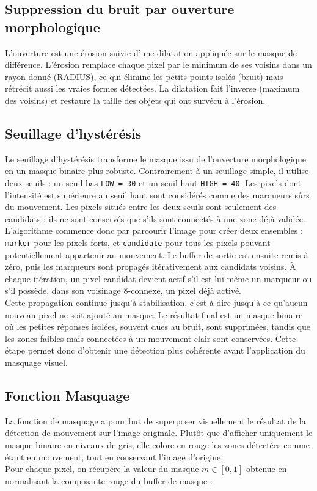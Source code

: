 \documentclass[12pt]{article}
\begin{document}
    \subsection{Suppression du bruit par ouverture morphologique}
    L'ouverture est une érosion suivie d'une dilatation appliquée sur le masque de différence. L'érosion remplace chaque pixel par le minimum de ses voisins dans un rayon donné (RADIUS), ce qui élimine les petits points isolés (bruit) mais rétrécit aussi les vraies formes détectées. La dilatation fait l'inverse (maximum des voisins) et restaure la taille des objets qui ont survécu à l'érosion.

    \subsection{Seuillage d'hystérésis}
    Le seuillage d'hystérésis transforme le masque issu de l'ouverture morphologique en un masque binaire plus robuste. Contrairement à un seuillage simple, il utilise deux seuils : un seuil bas \verb|LOW = 30| et un seuil haut \verb|HIGH = 40|. Les pixels dont l'intensité est supérieure au seuil haut sont considérés comme des marqueurs sûrs du mouvement. Les pixels situés entre les deux seuils sont seulement des candidats : ils ne sont conservés que s'ils sont connectés à une zone déjà validée.
    \\
    L'algorithme commence donc par parcourir l'image pour créer deux ensembles : \verb|marker| pour les pixels forts, et \verb|candidate| pour tous les pixels pouvant potentiellement appartenir au mouvement. Le buffer de sortie est ensuite remis à zéro, puis les marqueurs sont propagés itérativement aux candidats voisins. À chaque itération, un pixel candidat devient actif s'il est lui-même un marqueur ou s'il possède, dans son voisinage 8-connexe, un pixel déjà activé.
    \\
    Cette propagation continue jusqu'à stabilisation, c'est-à-dire jusqu'à ce qu'aucun nouveau pixel ne soit ajouté au masque. Le résultat final est un masque binaire où les petites réponses isolées, souvent dues au bruit, sont supprimées, tandis que les zones faibles mais connectées à un mouvement clair sont conservées. Cette étape permet donc d'obtenir une détection plus cohérente avant l'application du masquage visuel.

    \subsection{Fonction Masquage}
    La fonction de masquage a pour but de superposer visuellement le résultat de la détection de mouvement sur l'image originale. Plutôt que d'afficher uniquement le masque binaire en niveaux de gris, elle colore en rouge les zones détectées comme étant en mouvement, tout en conservant l'image d'origine.
    \\
    Pour chaque pixel, on récupère la valeur du masque $m \in [0, 1]$ obtenue en normalisant la composante rouge du buffer de masque :
\end{document}
